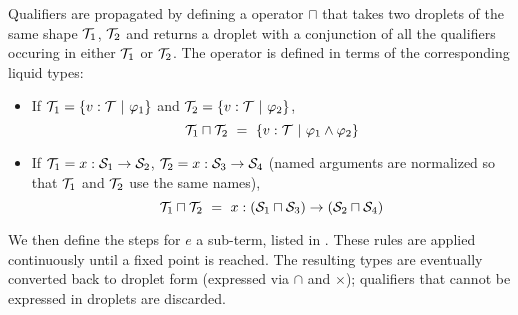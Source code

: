 Qualifiers are propagated by defining a  operator $\sqcap$ that
takes two droplets of the same shape $\mathcal{T}_1$, $\mathcal{T}_2$ and returns a droplet with a conjunction of all the qualifiers
occuring in either $\mathcal{T}_1$ or $\mathcal{T}_2$. The operator is defined in terms of the corresponding liquid types:
\begin{itemize}
  \item If $\mathcal{T}_1=\{v:\mathcal{T} ~|~ \varphi_1\}$ and $\mathcal{T}_2=\{v:\mathcal{T} ~|~ \varphi_2\}$,
	\[\mathcal{T}_1\sqcap\mathcal{T}_2 ~=~ \{v:\mathcal{T} ~|~ \varphi_1\land\varphi_2\}\]
  \item If $\mathcal{T}_1=x:\mathcal{S}_1\to\mathcal{S}_2$, $\mathcal{T}_2=x:\mathcal{S}_3\to\mathcal{S}_4$ (named arguments are normalized so that $\mathcal{T}_1$ and $\mathcal{T}_2$ use the same names),
    \[\mathcal{T}_1\sqcap\mathcal{T}_2 ~=~ x:(\mathcal{S}_1\sqcap\mathcal{S}_3)\to(\mathcal{S}_2\sqcap\mathcal{S}_4)\]
\end{itemize}

We then define the  steps for $e$ a sub-term, listed in .
These rules are applied continuously until a fixed point is reached.
The resulting types are eventually converted back to droplet form (expressed via $\cap$ and $\times$);
qualifiers that cannot be expressed in droplets are discarded.

